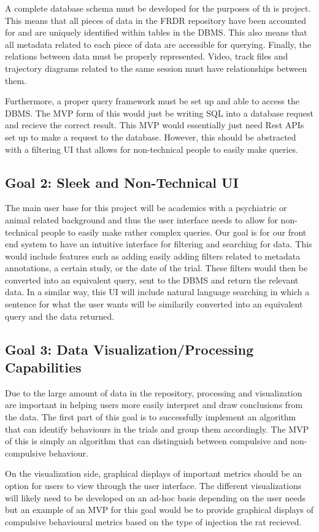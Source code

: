 \documentclass{article}
\begin{document}
  \par{ A complete database schema must be developed for the purposes
  of th is project. This means that all pieces of data in the FRDR repository have
  been accounted for and are uniquely identified within tables in the DBMS. This also means that
  all metadata related to each piece of data are accessible for querying. Finally,
  the relations between data must be properly represented. Video, track files and trajectory diagrams
  related to the same session must have relationships between them.
  
  Furthermore, a proper query framework must be set up and able to access the DBMS. 
  The MVP form of this would just be writing SQL into a database request and
  recieve the correct result. This MVP would essentially just need Rest APIs set up
  to make a request to the database. However, this should be abstracted with a filtering UI that
  allows for non-technical people to easily make queries.}

  \subsection{Goal 2: Sleek and Non-Technical UI}
  
  \par{The main user base for this project will be academics with a psychiatric or
  animal related background and thus the user interface needs to allow for non-technical
  people to easily make rather complex queries. Our goal is for our front end system to have an intuitive
  interface for filtering and searching for data. This would include features such as adding easily adding filters related to metadata annotations, a certain study,
  or the date of the trial. These filters would then be converted into an equivalent query, sent to the DBMS and return the relevant data. In a similar way,
  this UI will include natural language searching in which a sentence for what the user wants will be similarily converted into an equivalent query and the data returned.}

 \subsection{Goal 3: Data Visualization/Processing Capabilities} 
 
 \par{Due to the large amount of data in the repository, processing and visualization are important in
  helping users more easily interpret and draw conclusions from the data. The first part of this goal is to successfully implement an algorithm that
  can identify behaviours in the trials and group them accordingly. The MVP of this is simply an algorithm that can distinguish between compulsive and non-compulsive
  behaviour.
  
  On the visualization side, graphical displays of important metrics should be an option for users to view through the user interface. The different
  visualizations will likely need to be developed on an ad-hoc basis depending on the user needs but an example of an MVP for this goal would be to provide graphical
  displays of compulsive behavioural metrics based on the type of injection the rat recieved.}
\end{document}
